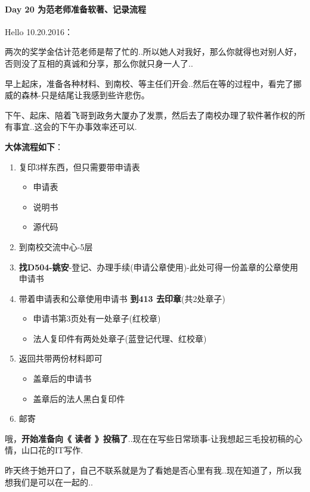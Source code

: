 \documentclass[UTF8,a4paper,8pt]{ctexbook}
\begin{document}
 	 \paragraph{Day 20   为范老师准备软著、记录流程   \quad     }
	 	 Hello 10.20.2016：
	 	 
	 	 两次的奖学金估计范老师是帮了忙的..所以她人对我好，那么你就得也对别人好，否则没了互相的真诚和分享，那么你就只身一人了..
	 	 
	 	 早上起床，准备各种材料、到南校、等主任们开会..然后在等的过程中，看完了挪威的森林-只是结尾让我感到些许悲伤。
	 	 
	 	 下午、起床、陪着飞哥到政务大厦办了发票，然后去了南校办理了软件著作权的所有事宜..这会的下午办事效率还可以.
	 	 
	 	 \textbf{大体流程如下}：
		 	 
		 \begin{enumerate}[itemindent = 1em]
		 	\item 复印3样东西，但只需要带申请表
			 	\begin{itemize}
			 		\item 申请表
			 		\item 说明书
			 		\item 源代码
			 	\end{itemize}
		 	\item 到南校交流中心-5层
		 	\item \textbf{找D504-姚安}-登记、办理手续(申请公章使用)-此处可得一份盖章的公章使用申请书
		 	\item 带着申请表和公章使用申请书 \textbf{到413 去印章}(共2处章子)
			 	\begin{itemize}
			 		\item 申请书第3页处有一处章子(红校章)
			 		\item 法人复印件有两处处章子(蓝登记代理、红校章)
			 	\end{itemize}
		 	\item 返回共带两份材料即可
			 	\begin{itemize}
			 		\item 盖章后的申请书
			 		\item 盖章后的法人黑白复印件 
			 	\end{itemize}
			\item 邮寄
		 \end{enumerate}
		 
		 哦，\textbf{开始准备向《 读者 》投稿了}..现在在写些日常琐事-让我想起三毛投初稿的心情，山口花的IT写作.
		 
		 昨天终于她开口了，自己不联系就是为了看她是否心里有我..现在知道了，所以我想我们是可以在一起的..
		 
\end{document}
